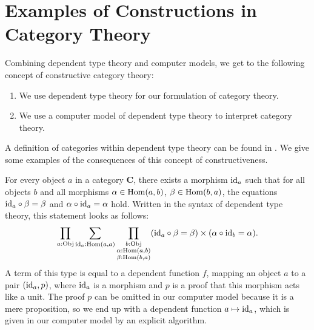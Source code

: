 \section{Examples of Constructions in Category Theory}

Combining dependent type theory and computer models, we get to the following 
concept of constructive category theory:
\begin{enumerate}
 \item We use dependent type theory for our formulation of category theory.
 \item We use a computer model of dependent type theory to interpret category theory.
\end{enumerate}
A definition of categories within dependent type theory can be found in \cite{hottbook}.
We give some examples of the consequences of this concept of constructiveness.

\begin{example}[Identities]
 For every object $a$ in a category $\mathbf{C}$, there exists a morphism
 $\mathrm{id}_a$ such that for all objects $b$ and all morphisms $\alpha \in \operatorname{\mathrm{Hom}}( a, b )$, $\beta \in \operatorname{\mathrm{Hom}}( b, a )$,
 the equations $\mathrm{id}_a \circ \beta = \beta$ and $\alpha \circ \mathrm{id}_a = \alpha$ hold.
 Written in the syntax of dependent type theory, this statement looks as follows:
 \[
  \prod_{a:\mathrm{Obj}} \sum_{\mathrm{id}_a: \operatorname{\mathrm{Hom}}(a,a)} \prod_{\substack{ b: \mathrm{Obj} \\ \alpha: \operatorname{\mathrm{Hom}}(a,b) \\ \beta: \operatorname{\mathrm{Hom}}(b,a)}}( \mathrm{id}_a \circ \beta = \beta ) \times ( \alpha \circ \mathrm{id}_b = \alpha ).
 \]
 A term of this type is equal to a
 dependent function $f$, mapping an object $a$ to a pair $(\mathrm{id}_a, p)$,
 where $\mathrm{id}_a$ is a morphism and $p$ is a proof that this morphism acts like a unit.
 The proof $p$ can be omitted in our computer model because it is a mere proposition, so we end up
 with a dependent function $a \mapsto \mathrm{id}_a$, which is given in our computer model
 by an explicit algorithm.
\end{example}

